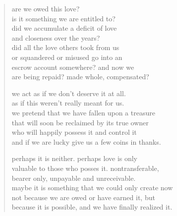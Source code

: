 \begin{verse}
are we owed this love? \\
is it something we are entitled to? \\
did we accumulate a deficit of love \\
and closeness over the years? \\
did all the love others took from us \\
or squandered or misused go into an \\
escrow account somewhere? and now we \\
are being repaid? made whole, compensated?

we act as if we don't deserve it at all. \\
as if this weren't really meant for us. \\
we pretend that we have fallen upon a treasure \\
that will soon be reclaimed by its true owner \\
who will happily possess it and control it \\
and if we are lucky give us a few coins in thanks.

perhaps it is neither. perhaps love is only \\
valuable to those who posses it. nontransferable, \\
bearer only, unpayable and unreceivable. \\
maybe it is something that we could only create now \\
not because we are owed or have earned it, but \\
because it is possible, and we have finally realized it.
\end{verse}
